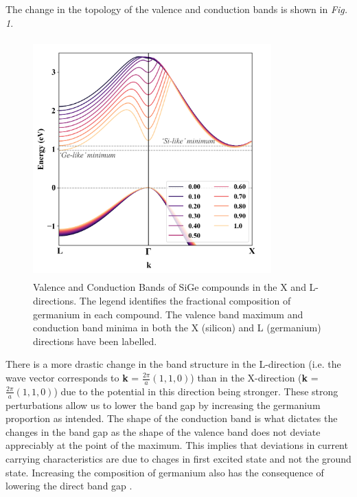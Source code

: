 \documentclass[10pt, twocolumn]{revtex4}    %
\begin{document}
The change in the topology of the valence and conduction bands is shown in \textit{Fig. 1}.
\begin{figure}[h!]
 \hspace*{-0.5cm}
  \includegraphics[width=260pt,height=260pt]{bands.png}

    \caption{Valence and Conduction Bands of SiGe compounds in the X and L-directions. The legend identifies the fractional composition of germanium in each compound. The valence band maximum and conduction band minima in both the X (silicon) and L (germanium) directions have been labelled. }
\end{figure}

There is a more drastic change in the band structure in the L-direction (i.e. the wave vector corresponds to \textbf{k} = $\frac{2\pi}{a} (1,1,0)$) than in the X-direction (\textbf{k} = $\frac{2\pi}{a} (1,1,0)$) due to the potential in this direction being stronger. These strong perturbations allow us to lower the band gap by increasing the germanium proportion as intended. The shape of the conduction band is what dictates the changes in the band gap as the shape of the valence band does not deviate appreciably at the point of the maximum. This implies that deviations in current carrying characteristics are due to chages in first excited state and not the ground state. Increasing the composition of germanium also has the consequence of lowering the direct band gap \cite{ref15}.\\
\end{document}
